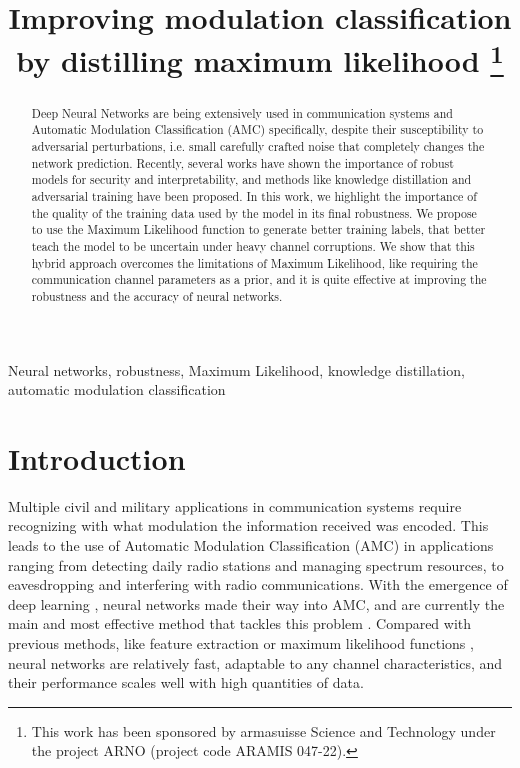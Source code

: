 \documentclass[conference]{IEEEtran}
\title{Improving modulation classification by distilling maximum likelihood
\thanks{This work has been sponsored by armasuisse Science and Technology under the project ARNO (project code ARAMIS 047-22).}
}
\author{\IEEEauthorblockN{Javier Maroto}
\IEEEauthorblockA{\textit{Signal Processing Laboratory (LTS4)} \\ \textit{EPFL, Switzerland}}
\and
\IEEEauthorblockN{Gérôme Bovet}
\IEEEauthorblockA{\textit{armasuisse Science\&Technology} \\
\textit{Cyber-Defence Campus, Switzerland}}
\and
\IEEEauthorblockN{Pascal Frossard}
\IEEEauthorblockA{\textit{Signal Processing Laboratory (LTS4)} \\ \textit{EPFL, Switzerland}}}
\begin{document}
\maketitle

\begin{abstract}
Deep Neural Networks are being extensively used in communication systems and Automatic Modulation Classification (AMC) specifically, despite their susceptibility to adversarial perturbations, i.e. small carefully crafted noise that completely changes the network prediction. Recently, several works have shown the importance of robust models for security and interpretability, and methods like knowledge distillation and adversarial training have been proposed. In this work, we highlight the importance of the quality of the training data used by the model in its final robustness. We propose to use the Maximum Likelihood function to generate better training labels, that better teach the model to be uncertain under heavy channel corruptions. We show that this hybrid approach overcomes the limitations of Maximum Likelihood, like requiring the communication channel parameters as a prior, and it is quite effective at improving the robustness and the accuracy of neural networks. 
\end{abstract}

\begin{IEEEkeywords}
Neural networks, robustness, Maximum Likelihood, knowledge distillation, automatic modulation classification
\end{IEEEkeywords}

\section{Introduction}

Multiple civil and military applications in communication systems require recognizing with what modulation the information received was encoded. This leads to the use of Automatic Modulation Classification (AMC) in applications ranging from detecting daily radio stations and managing spectrum resources, to eavesdropping and interfering with radio communications. With the emergence of deep learning \cite{goodfellow2016deep}, neural networks made their way into AMC, and are currently the main and most effective method that tackles this problem \cite{OShea_Roy_Clancy_2018}. Compared with previous methods, like feature extraction \cite{xie2008efficient,zhou2013design,zhang2017wireless} or maximum likelihood functions \cite{huan1995likelihood,dobre2007survey,hameed2009likelihood}, neural networks are relatively fast, adaptable to any channel characteristics, and their performance scales well with high quantities of data.
\end{document}
